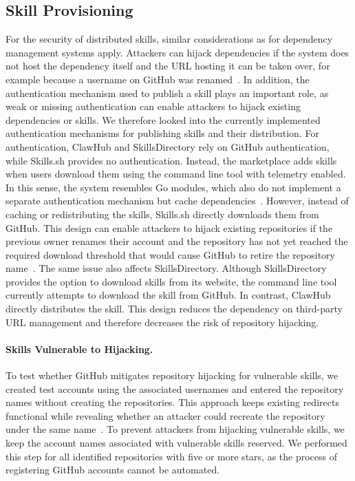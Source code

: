 \subsection{Skill Provisioning}
For the security of distributed skills, similar considerations as for dependency management systems apply. Attackers can hijack dependencies if the system does not host the dependency itself and the URL hosting it can be taken over, for example because a username on GitHub was renamed~\cite{schmidt:2025:app_secrets}. In addition, the authentication mechanism used to publish a skill plays an important role, as weak or missing authentication can enable attackers to hijack existing dependencies or skills. We therefore looked into the currently implemented authentication mechanisms for publishing skills and their distribution. For authentication, ClawHub and SkillsDirectory rely on GitHub authentication, while Skills.sh provides no authentication. Instead, the marketplace adds skills when users download them using the command line tool with telemetry enabled. In this sense, the system resembles Go modules, which also do not implement a separate authentication mechanism but cache dependencies~\cite{gu:2023:software_registries}.
However, instead of caching or redistributing the skills, Skills.sh directly downloads them from GitHub. This design can enable attackers to hijack existing repositories if the previous owner renames their account and the repository has not yet reached the required download threshold that would cause GitHub to retire the repository name~\cite{schmidt:2026:supplychaininsecurityexposing}. The same issue also affects SkillsDirectory. Although SkillsDirectory provides the option to download skills from its website, the command line tool currently attempts to download the skill from GitHub.
In contrast, ClawHub directly distributes the skill. This design reduces the dependency on third-party URL management and therefore decreases the risk of repository hijacking.

\paragraph{Skills Vulnerable to Hijacking.}
To test whether GitHub mitigates repository hijacking for vulnerable skills, we created test accounts using the associated usernames and entered the repository names without creating the repositories. This approach keeps existing redirects functional while revealing whether an attacker could recreate the repository under the same name~\cite{schmidt:2026:supplychaininsecurityexposing}. To prevent attackers from hijacking vulnerable skills, we keep the account names associated with vulnerable skills reserved. We performed this step for all identified repositories with five or more stars, as the process of registering GitHub accounts cannot be automated.

